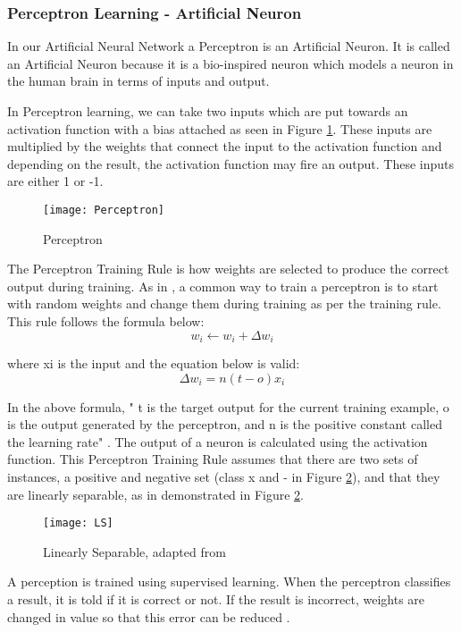 \subsubsection*{Perceptron Learning - Artificial Neuron}
In our Artificial Neural Network a Perceptron is an Artificial Neuron.
It is called an Artificial Neuron because it is a bio-inspired neuron which models
a neuron in the human brain in terms of inputs and output.

In Perceptron learning, we can take two inputs which are put towards an
activation function with a bias attached as seen in Figure \ref{fig:perceptron}.
These inputs are multiplied by the weights that connect the input to the
activation function and depending on the result, the activation function may
fire an output. These inputs are either 1 or -1.

\begin{figure}[h]
     \texttt{[image: Perceptron]}
     \caption{Perceptron}
     \label{fig:perceptron}
\end{figure}

The Perceptron Training Rule is how weights are selected to produce the correct output during training.
As in \parencite{MLANN}, a common way to train a perceptron is to start with random weights and change them during training as per the training rule.
This rule follows the formula below:
\[w_{i} \leftarrow w_{i} + \Delta w_{i}\]

where xi is the input and the equation below is valid:
\[\Delta w_{i} = n(t-o)x_{i}\]

In the above formula, " t is the target output for the current training example, o is the output generated by the perceptron, and n is the positive constant called the learning rate" \parencite{MLANN}.
The output of a neuron is calculated using the activation function.
This Perceptron Training Rule assumes that there are two sets of instances, a
positive and negative set (class x and - in Figure \ref{fig:ls}), and that they are linearly separable, as in demonstrated in Figure \ref{fig:ls}. 

\begin{figure}[h]
    \texttt{[image: LS]}
     \caption{Linearly Separable, adapted from \parencite{MLANN}}
     \label{fig:ls}
\end{figure}

A perception is trained using supervised learning. When the perceptron
classifies a result, it is told if it is correct or not. If the result is
incorrect, weights are changed in value so that this error can be reduced
\parencite{AI}. 

